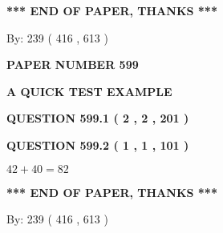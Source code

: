 \documentclass[12pt]{article}
\begin{document}
   
 \vspace{0.2in}
 
   
   
   
   
\vspace{1.0in} 
{\textbf{\large{ *** END OF PAPER, THANKS *** }}} 
   
   
\hspace{1.0in} By: 
 239 ( 416 ,  613 )
   
   
   
   
\newpage 
\setcounter{page}{ 
   599001 } 
   
   
   
   
 {\textbf{ \Large{ PAPER NUMBER  599  }}}
   
   
\vspace{0.2in}
   
   
   
   
   
   
 \vspace{0.2in}
{\LARGE {\textbf{ A QUICK TEST EXAMPLE}}}
   
   
  
\vspace{0.2in}
  
{\textbf{\Large{QUESTION
599.1 
 ( 2 , 2 , 201 )
}}}
  
  
  
\vspace{0.2in}
  
{\textbf{\Large{QUESTION
599.2 
 ( 1 , 1 , 101 )
}}}
  
  
 
 

$ %
42 +  %
40=   %
82$
 
 
   
   
 \vspace{0.2in}
 
   
   
   
   
\vspace{1.0in} 
{\textbf{\large{ *** END OF PAPER, THANKS *** }}} 
   
   
\hspace{1.0in} By: 
 239 ( 416 ,  613 )
   
   
   
   
\newpage 
\setcounter{page}{ 
   600001 } 
   
   
   
\end{document}
